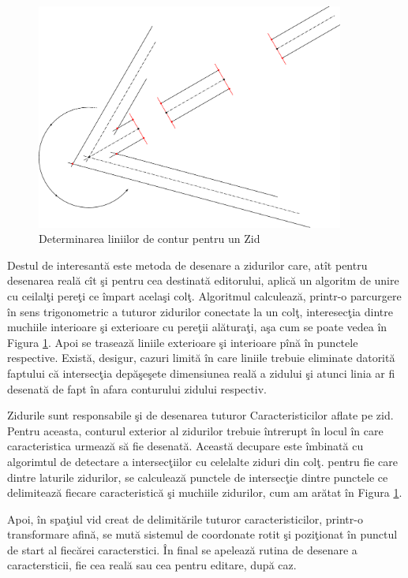 \begin{figure}[htp]
\begin{center}
  \includegraphics[width=0.9\textwidth]{figures/corners.pdf}
  \caption{Determinarea liniilor de contur pentru un Zid \label{figure:corner}}
\end{center}
\end{figure}

Destul de interesantă este metoda de desenare a zidurilor care, atît pentru 
desenarea reală cît şi pentru cea destinată editorului, aplică un algoritm de 
unire cu ceilalţi pereţi ce împart acelaşi colţ. Algoritmul calculează, 
printr-o parcurgere în sens trigonometric a tuturor zidurilor conectate la un 
colţ, interesecţia dintre muchiile interioare şi exterioare cu pereţii 
alăturaţi, aşa cum se poate vedea în Figura \ref{figure:corner}. Apoi se 
trasează liniile exterioare şi interioare pînă în punctele respective. Există, 
desigur, cazuri limită în care liniile trebuie eliminate datorită faptului că 
intersecţia depăşeşete dimensiunea reală a zidului şi atunci linia ar fi 
desenată de fapt în afara conturului zidului respectiv.

Zidurile sunt responsabile şi de desenarea tuturor Caracteristicilor aflate pe 
zid. Pentru aceasta, conturul exterior al zidurilor trebuie întrerupt în locul
în care caracteristica urmează să fie desenată. Această decupare este îmbinată
cu algorimtul de detectare a intersecţiilor cu celelalte ziduri din colţ. pentru
fie care dintre laturile zidurilor, se calculează punctele de intersecţie dintre
punctele ce delimitează fiecare caracteristică şi muchiile zidurilor, cum am
arătat în Figura \ref{figure:corner}.

Apoi, în spaţiul vid creat de delimitările tuturor caracteristicilor, printr-o
transformare afină, se mută sistemul de coordonate rotit şi poziţionat în
punctul de start al fiecărei caracterstici. În final se apelează rutina de
desenare a caractersticii, fie cea reală sau cea pentru editare, după caz.

